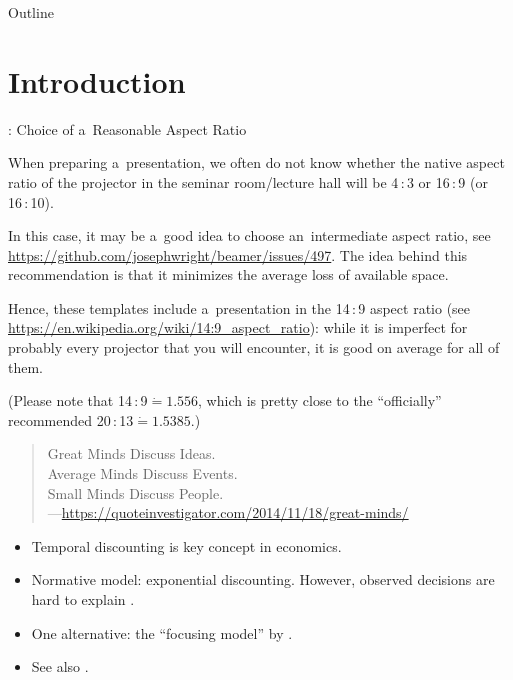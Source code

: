 \begin{frame}[standout]{Outline}

\medskip
\tableofcontents

\end{frame}






\section{Introduction}


\begin{frame}{\titleprefix: Choice of a~Reasonable Aspect Ratio}

When preparing a~presentation, we often do not know whether the native aspect ratio of the projector in the seminar room/lecture hall will be 4\,:\,3 or 16\,:\,9 (or 16\,:\,10).

In this case, it may be a~good idea to choose an~\alert{intermediate aspect ratio}, see \url{https://github.com/josephwright/beamer/issues/497}. The idea behind this recommendation is that it minimizes the average loss of available space.

Hence, these templates include a~presentation in the \alert{14\,:\,9 aspect ratio} (see \url{https://en.wikipedia.org/wiki/14:9_aspect_ratio}): while it is imperfect for probably every projector that you will encounter, it is good on average for all of them.

(Please note that 14\,:\,9${}\mathrel{\dot{=}} 1.556$, which is pretty close to the ``officially'' recommended 20\,:\,13${}\mathrel{\dot{=}} 1.5385$.)

\end{frame}


\begin{frame}{\titleprefix}

\begin{quote}
	Great Minds Discuss Ideas. \\
	Average Minds Discuss Events. \\
	Small Minds Discuss People. \\
	\upshape ---\url{https://quoteinvestigator.com/2014/11/18/great-minds/}
\end{quote}

\begin{itemize}
	\item Temporal discounting is key concept in economics.
	\item Normative model: exponential discounting. However, observed decisions are hard to explain \citep[e.g.,][]{Dohmen2012}.
	\item One alternative: the ``focusing model'' by \cite{Koszegi2013}.
	\item See also \cite{Lisi1995}.
\end{itemize}

\end{frame}


